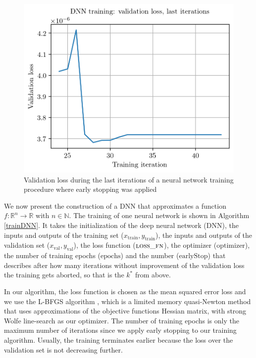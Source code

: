 \begin{figure}
\centering
\includegraphics{Plots/earlyStopping.png}
\caption{\label{earlyStoppingPlot}Validation loss during the last iterations of a neural network training procedure where early stopping was applied}
\end{figure}

We now present the construction of a DNN that approximates a function $f:\mathbb{R}^n\to\mathbb{R}$ with $n\in\mathbb{N}$. The training of one neural network is shown in Algorithm \ref{trainDNN}. It takes the initialization of the deep neural network ($\mathrm{DNN}$), the inputs and outputs of the training set ($x_\mathrm{train}, y_\mathrm{train}$), the inputs and outputs of the validation set ($x_\mathrm{val}, y_\mathrm{val}$), the loss function ($\textproc{loss\_fn}$), the optimizer ($\mathrm{optimizer}$), the number of training epochs ($\mathrm{epochs}$) and the number ($\mathrm{earlyStop}$) that describes after how many iterations without improvement of the validation loss the training gets aborted, so that is the $k^*$ from above.

In our algorithm, the loss function is chosen as the mean squared error loss and we use the L-BFGS algorithm \cite{Liu1989-ua}, which is a limited memory quasi-Newton method that uses approximations of the objective functions Hessian matrix, with strong Wolfe line-search \cite{doi:10.1137/1011036, doi:10.1137/1013035} as our optimizer. The number of training epochs is only the maximum number of iterations since we apply early stopping to our training algorithm. Usually, the training terminates earlier because the loss over the validation set is not decreasing further.

